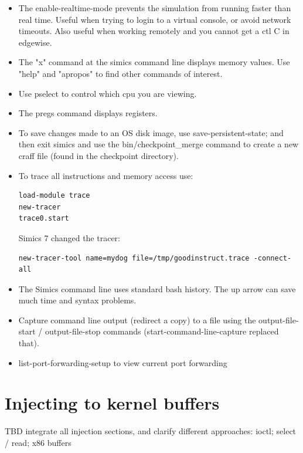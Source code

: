 \documentclass[titlepage]{article}
\begin{document}
\begin{appendices}
\begin{itemize}
\item The enable-realtime-mode prevents the simulation from running faster than real time.  Useful when trying to login
to a virtual console, or avoid network timeouts.  Also useful when working remotely and you cannot get a ctl C in 
edgewise.

\item The "x" command at the simics command line displays memory values.  Use "help" and "apropos" to find other commands of interest.

\item Use pselect to control which cpu you are viewing.

\item The pregs command displays registers.  

\item To save changes made to an OS disk image, use save-persistent-state; and then exit simics and use the bin/checkpoint\_merge command
to create a new craff file (found in the checkpoint directory).

\item To trace all instructions and memory access use:
\begin{verbatim}
load-module trace
new-tracer
trace0.start
\end{verbatim}

Simics 7 changed the tracer:
\begin{verbatim}
new-tracer-tool name=mydog file=/tmp/goodinstruct.trace -connect-all
\end{verbatim}

\item The Simics command line uses standard bash history.  The up arrow can save much time and syntax problems.

\item Capture command line output (redirect a copy) to a file using the output-file-start / output-file-stop commands
(start-command-line-capture replaced that).

\item {list-port-forwarding-setup} to view current port forwarding
\end{itemize}

\section{Injecting to kernel buffers}
TBD integrate all injection sections, and clarify different approaches: ioctl; select / read; x86 buffers


\end{appendices}
\end{document}
